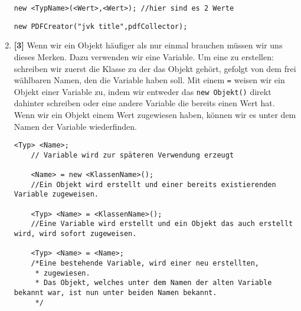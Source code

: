 \begin{enumerate}
\begin{lstlisting}[title=\textbf{Konstruktor Syntax},firstnumber=5]
    new <TypName>(<Wert>,<Wert>); //hier sind es 2 Werte
    \end{lstlisting}
          \begin{lstlisting}[title=\textbf{Beispiel (1/3) Konstruktor},firstnumber=2,frame=lr]
        new PDFCreator("jvk title",pdfCollector);
    \end{lstlisting}
    \item \textbf{[3]} Wenn wir ein Objekt häufiger als nur einmal brauchen müssen wir uns dieses Merken. Dazu verwenden wir eine Variable. Um eine zu erstellen: schreiben wir zuerst die Klasse zu der das Objekt gehört, gefolgt von dem frei wählbaren Namen, den die Variable haben soll. Mit einem \lstinline{=} weisen wir ein Objekt einer Variable zu, indem wir entweder das \lstinline{new Objekt()} direkt dahinter schreiben oder eine andere
          Variable die bereits einen Wert hat.
          Wenn wir ein Objekt einem Wert zugewiesen haben, können wir es unter dem Namen der Variable wiederfinden.
          \begin{lstlisting}[title=\textbf{Variablen Syntax}]
    <Typ> <Name>; 
    // Variable wird zur späteren Verwendung erzeugt

    <Name> = new <KlassenName>(); 
    //Ein Objekt wird erstellt und einer bereits existierenden Variable zugeweisen.

    <Typ> <Name> = <KlassenName>(); 
    //Eine Variable wird erstellt und ein Objekt das auch erstellt wird, wird sofort zugeweisen.

    <Typ> <Name> = <Name>; 
    /*Eine bestehende Variable, wird einer neu erstellten,
     * zugewiesen.
     * Das Objekt, welches unter dem Namen der alten Variable bekannt war, ist nun unter beiden Namen bekannt.
     */


\end{lstlisting}
\end{enumerate}
